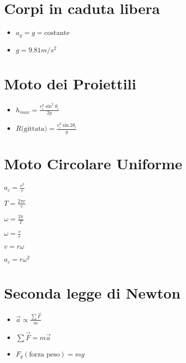 \documentclass[a4paper,14pt,landscape]{extarticle}
\begin{document}
\begin{multicols*}{2}
    \section*{Corpi in caduta libera}
    \begin{itemize}
        \item $a_y = g = \text{costante}$
        \item $g = 9.81 m/s^2$
    \end{itemize}

    \section*{Moto dei Proiettili}
    \begin{itemize}
        \item $h_{max} = \frac{v_i^2 \sin^2 \theta_i}{2g}$
        \item $R \text{(gittata)} = \frac{v_i^2 \sin 2\theta_i}{g}$
    \end{itemize}

    \section*{Moto Circolare Uniforme}
    \begin{itemize}
        \begin{multicols*}{2}
            \item $a_c = \frac{v^2}{r}$
            \item $T = \frac{2 \pi r}{v}$
            \item $\omega = \frac{2\pi}{T}$
            \item $\omega = \frac{v}{r}$
            \item $v = r\omega$
            \item $a_c = r\omega^2$
        \end{multicols*}
    \end{itemize}

    \section*{Seconda legge di Newton}
    \begin{itemize}
        \item $\vec{a} \propto \frac{\sum \vec{F}}{m}$
        \item $\sum \vec{F} = m\vec{a}$
        \item $F_g (\text{forza peso}) = mg$
    \end{itemize}


\end{multicols*}
\end{document}
